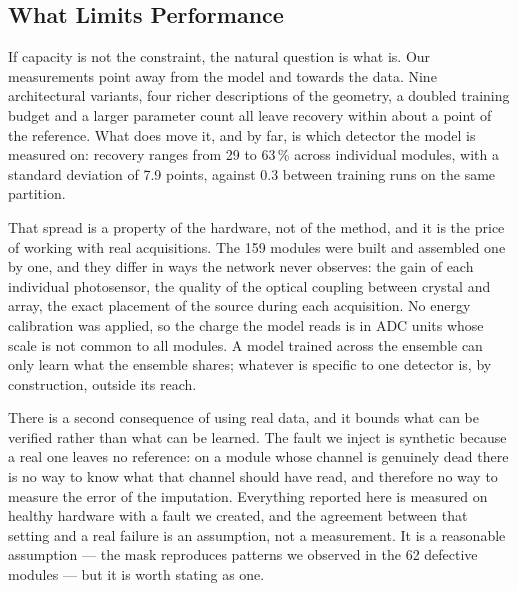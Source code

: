 \documentclass[10pt,conference]{IEEEtran}
\begin{document}
\subsection{What Limits Performance}
\label{sec:disc-limits}

If capacity is not the constraint, the natural question is what is. Our
measurements point away from the model and towards the data. Nine architectural
variants, four richer descriptions of the geometry, a doubled training budget
and a larger parameter count all leave recovery within about a point of the
reference. What does move it, and by far, is
which detector the model is measured on: recovery ranges from 29 to 63\,\%
across individual modules, with a standard deviation of 7.9 points, against 0.3
between training runs on the same partition.

That spread is a property of the hardware, not of the method, and it is the
price of working with real acquisitions. The 159 modules were built and
assembled one by one, and they differ in ways the network never observes: the
gain of each individual photosensor, the quality of the optical coupling
between crystal and array, the exact placement of the source during each
acquisition. No energy calibration was applied, so the charge the model reads
is in ADC units whose scale is not common to all modules. A model trained
across the ensemble can only learn what the ensemble shares; whatever is
specific to one detector is, by construction, outside its reach.

There is a second consequence of using real data, and it bounds what can be
verified rather than what can be learned. The fault we inject is synthetic
because a real one leaves no reference: on a module whose channel is genuinely
dead there is no way to know what that channel should have read, and therefore
no way to measure the error of the imputation. Everything reported here is
measured on healthy hardware with a fault we created, and the agreement between
that setting and a real failure is an assumption, not a measurement. It is a
reasonable assumption --- the mask reproduces patterns we observed in the 62
defective modules --- but it is worth stating as one.
\end{document}
